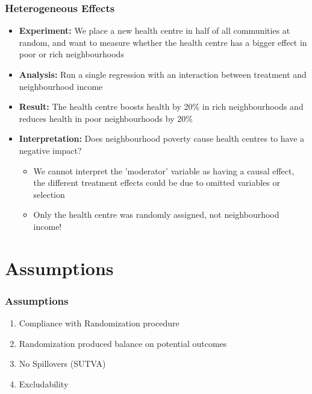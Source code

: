 \documentclass[xcolor=x11names,compress]{beamer}\usepackage[]{graphicx}\usepackage[]{color}
\renewcommand{\(}{\begin{columns}}
\renewcommand{\)}{\end{columns}}
\newcommand{\<}[1]{\begin{column}{#1}}
\renewcommand{\>}{\end{column}}
\begin{document}
\begin{frame}
\frametitle{Heterogeneous Effects}
\begin{itemize}
\item \textbf{Experiment:} We place a new health centre in half of all communities at random, and want to measure whether the health centre has a bigger effect in poor or rich neighbourhoods
\pause
\item \textbf{Analysis:} Run a single regression with an interaction between treatment and neighbourhood income
\pause
\item \textbf{Result:} The health centre boosts health by 20\% in rich neighbourhoods and reduces health in poor neighbourhoods by 20\%
\pause
\item \textbf{Interpretation:} Does neighbourhood poverty cause health centres to have a negative impact?  
\begin{itemize}
\pause
\item We cannot interpret the 'moderator' variable as having a causal effect, the different treatment effects could be due to omitted variables or selection
\pause
\item Only the health centre was randomly assigned, not neighbourhood income!
\end{itemize}
\end{itemize}
\end{frame}

\section{Assumptions}

\begin{frame}
\frametitle{Assumptions}
\begin{enumerate}
\item Compliance with Randomization procedure
\pause
\item Randomization produced balance on potential outcomes
\pause
\item No Spillovers (SUTVA)
\pause
\item Excludability
\pause
\end{enumerate}
\end{frame}
\end{document}
